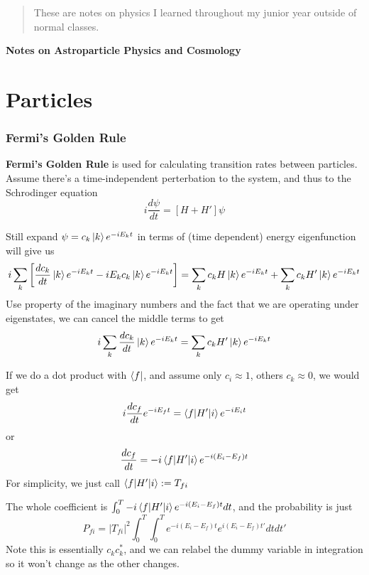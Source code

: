 \documentclass[11pt]{article}
\newcommand{\mytitlecompact}[1]{{

\hfill
{\Large \sffamily \bfseries{#1}}
\hfill
}}
\newcommand{\expectation}[1]{\langle #1\rangle}
\begin{document}
\begin{abstract}
    These are notes on physics I learned throughout my junior year outside of normal classes. 
\end{abstract}
\mytitlecompact{Notes on Astroparticle Physics and Cosmology}
\part{Particles}
\section{Fermi's Golden Rule}
\textbf{Fermi's Golden Rule} is used for calculating transition rates between particles. 
Assume there's a time-independent perterbation to the system, and thus to the Schrodinger equation
\begin{equation}
    i\frac{d \psi}{d t} = \left[H + H'\right]\psi
\end{equation}

Still expand $\psi = c_k \ket{k}e^{-iE_k t}$ in terms of (time dependent) energy eigenfunction will give us 
\begin{equation}
    i\sum_k \left[ \frac{d c_k}{dt}\ket{k}e^{-iE_k t}- i E_k c_k \ket{k}e^{-iE_kt}\right] =
    \sum_k c_k H \ket{k}e^{-iE_kt} + \sum_k c_k H' \ket{k}e^{-iE_kt}
\end{equation}
Use property of the imaginary numbers and the fact that we are operating under eigenstates, we can cancel the middle terms to get 
\begin{equation}
    i\sum_k \frac{d c_k}{dt}\ket{k}e^{-iE_k t} = \sum_k c_k H' \ket{k}e^{-iE_kt} \label{fermi golden rule 1st}
\end{equation}

If we do a dot product with $\bra{f}$, and assume only $c_i\approx 1$, others $c_k\approx 0$,
we would get 
\begin{equation}
    i \frac{d c_f}{dt} e^{-i E_f t} = \braket{f|H'|i}e^{-iE_i t}
\end{equation}
or 
\begin{equation}
    \frac{d c_f}{dt}  = -i \braket{f|H'|i}e^{-i(E_i- E_f)t}
\end{equation}
For simplicity, we just call $\braket{f|H'|i}:= T_{fi}$

The whole coefficient is $\int_0^T -i \braket{f|H'|i}e^{-i(E_i- E_f)t} dt$,
and the probability is just 
\[P_{fi} = |T_{fi}|^2 \int_0^T\int_0^T e^{-i(E_i- E_f)t} e^{i(E_i- E_f)t'} dt dt'\]
Note this is essentially $c_k c_k^*$, and we can relabel the dummy variable in integration so 
it won't change as the other changes. 
\end{document}
